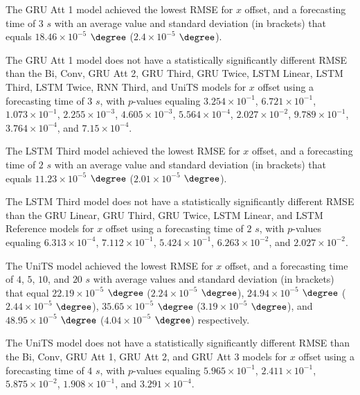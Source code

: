 
The GRU Att 1 model achieved the lowest RMSE for $x$ offset, and a forecasting time of $3$ $s$ with an average value and standard deviation (in brackets) that equals $18.46 \times 10^{-5}$ $\degree$ ($2.4 \times 10^{-5}$ $\degree$).

The GRU Att 1 model does not have a statistically significantly different RMSE than the Bi, Conv, GRU Att 2, GRU Third, GRU Twice, LSTM Linear, LSTM Third, LSTM Twice, RNN Third, and UniTS models for $x$ offset using a forecasting time of $3$ $s$, with $p$-values equaling $3.254 \times 10^{-1}$, $6.721 \times 10^{-1}$, $1.073 \times 10^{-1}$, $2.255 \times 10^{-3}$, $4.605 \times 10^{-3}$, $5.564 \times 10^{-4}$, $2.027 \times 10^{-2}$, $9.789 \times 10^{-1}$, $3.764 \times 10^{-4}$, and $7.15 \times 10^{-4}$.


The LSTM Third model achieved the lowest RMSE for $x$ offset, and a forecasting time of $2$ $s$ with an average value and standard deviation (in brackets) that equals $11.23 \times 10^{-5}$ $\degree$ ($2.01 \times 10^{-5}$ $\degree$).

The LSTM Third model does not have a statistically significantly different RMSE than the GRU Linear, GRU Third, GRU Twice, LSTM Linear, and LSTM Reference models for $x$ offset using a forecasting time of $2$ $s$, with $p$-values equaling $6.313 \times 10^{-4}$, $7.112 \times 10^{-1}$, $5.424 \times 10^{-1}$, $6.263 \times 10^{-2}$, and $2.027 \times 10^{-2}$.


The UniTS model achieved the lowest RMSE for $x$ offset, and a forecasting time of $4$, $5$, $10$, and $20$ $s$ with average values and standard deviation (in brackets) that equal $22.19 \times 10^{-5}$ $\degree$ ($2.24 \times 10^{-5}$ $\degree$), $24.94 \times 10^{-5}$ $\degree$ ($2.44 \times 10^{-5}$ $\degree$), $35.65 \times 10^{-5}$ $\degree$ ($3.19 \times 10^{-5}$ $\degree$), and $48.95 \times 10^{-5}$ $\degree$ ($4.04 \times 10^{-5}$ $\degree$) respectively.

The UniTS model does not have a statistically significantly different RMSE than the Bi, Conv, GRU Att 1, GRU Att 2, and GRU Att 3 models for $x$ offset using a forecasting time of $4$ $s$, with $p$-values equaling $5.965 \times 10^{-1}$, $2.411 \times 10^{-1}$, $5.875 \times 10^{-2}$, $1.908 \times 10^{-1}$, and $3.291 \times 10^{-4}$.

